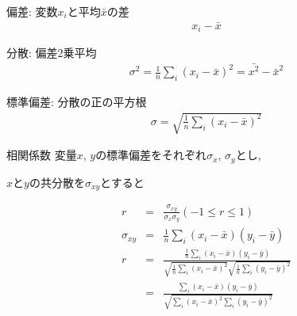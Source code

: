 \documentclass[aspectratio=169, 12pt]{beamer}
\begin{document}
\begin{frame}{偏差: 変数$x_i$と平均$\bar{x}$の差}
    \begin{eqnarray*}
        x_i-\bar{x}
    \end{eqnarray*}
\end{frame}
\begin{frame}{分散: 偏差2乗平均}
    \begin{eqnarray*}
        \sigma^2=\frac{1}{n}\sum_i (x_i-\bar{x})^2=\bar{x^2}-\bar{x}^2
    \end{eqnarray*}
\end{frame}
\begin{frame}{標準偏差: 分散の正の平方根}
    \begin{eqnarray*}
        \sigma=\sqrt{\frac{1}{n}\sum_i (x_i-\bar{x})^2}
    \end{eqnarray*}
\end{frame}
\begin{frame}{相関係数}
    変量$x$, $y$の標準偏差をそれぞれ$\sigma_x$, $\sigma_y$とし, \par
    $x$と$y$の共分散を$\sigma_{xy}$とすると \par
    \begin{eqnarray*}
        r&=&\frac{\sigma_{xy}}{\sigma_x\sigma_y} (-1\leq r \leq 1) \\
        \sigma_{xy}&=&\frac{1}{n}\sum_i(x_i-\bar{x})(y_i-\bar{y}) \\
        r&=&\frac{\frac{1}{n}\sum_i(x_i-\bar{x})(y_i-\bar{y})}{\sqrt{\frac{1}{n}\sum_i(x_i-\bar{x})^2}\sqrt{\frac{1}{n}\sum_i(y_i-\bar{y})^2}} \\
        &=&\frac{\sum_i(x_i-\bar{x})(y_i-\bar{y})}{\sqrt{\sum_i(x_i-\bar{x})^2\sum_i(y_i-\bar{y})^2}}
    \end{eqnarray*}
\end{frame}
\end{document}
